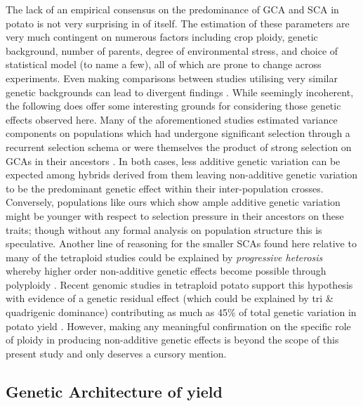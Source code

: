 \begin{refsection}
The lack of an empirical consensus on the predominance of GCA and SCA in potato is not very surprising in of itself. The estimation of these parameters are very much contingent on numerous factors including crop ploidy, genetic background, number of parents, degree of environmental stress, and choice of statistical model (to name a few), all of which are prone to change across experiments. Even making comparisons between studies utilising very similar genetic backgrounds can lead to divergent findings \parencite{Tarn1977, Maris1989}. While seemingly incoherent, the following does offer some interesting grounds for considering those genetic effects observed here. Many of the aforementioned studies estimated variance components on populations which had undergone significant selection through a recurrent selection schema \parencite{Haynes2001, Maris1989} or were themselves the product of strong selection on GCAs in their ancestors \parencite{Tai1976}. In both cases, less additive genetic variation can be expected among hybrids derived from them leaving non-additive genetic variation to be the predominant genetic effect within their inter-population crosses. Conversely, populations like ours which show ample additive genetic variation might be younger with respect to selection pressure in their ancestors on these traits; though without any formal analysis on population structure this is speculative. Another line of reasoning for the smaller SCAs found here relative to many of the tetraploid studies could be explained by \emph{progressive heterosis} whereby higher order non-additive genetic effects become possible through polyploidy \parencite{Birchler2003}. Recent genomic studies in tetraploid potato support this hypothesis with evidence of a genetic residual effect (which could be explained by tri \& quadrigenic dominance) contributing as much as 45\% of total genetic variation in potato yield \parencite{Endelman2018}. However, making any meaningful confirmation on the specific role of ploidy in producing non-additive genetic effects is beyond the scope of this present study and only deserves a cursory mention.

\subsection{Genetic Architecture of yield}\label{genetic-architecture-of-yield}


\end{refsection}
